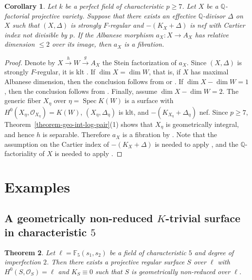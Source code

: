 \documentclass[reqno,oneside]{amsart}
\newtheorem{theorem}{Theorem}[section]
\newtheorem{corollary}[theorem]{Corollary}
\theoremstyle{definition}
\theoremstyle{plain}
\numberwithin{equation}{section}
\newcommand\Spec{\operatorname{Spec}}
\begin{document}
\begin{corollary}\label{corollary-fib-codim2}
  Let $k$ be a perfect field of characteristic $p\ge7$.
  Let $X$ be a $\mathbb Q$-factorial projective variety.
  Suppose that there exists an effective $\mathbb Q$-divisor $\Delta$ on $X$ such that $(X,\Delta)$ is strongly $F$-regular and $-(K_X+\Delta)$ is nef with Cartier index not divisible by $p$.
   If the Albanese morphism $a_X\colon X\to A_X$ has relative dimension $\leq 2$ over its image, then $a_X$ is a fibration.
\end{corollary}
\begin{proof}
  Denote by $X\xrightarrow{h} W\xrightarrow{g} A_X$ the Stein factorization of $a_X$.
  Since $(X,\Delta)$ is strongly $F$-regular, it is klt \cite[Theorem~3.3]{Hara-Watanabe-2002}.
  If $\dim X = \dim W$, that is, if $X$ has maximal Albanese dimension, then the conclusion follows from \cite[Proposition~3.2]{EP23} or \cite[Proposition~2.9]{CWZ26a}.
  If $\dim X - \dim W = 1$, then the conclusion follows from \cite[Theorem~1.5]{CWZ26a}.
  Finally, assume $\dim X - \dim W =2$.
  The generic fiber $X_\eta$ over $\eta=\Spec K(W)$ is a surface with $H^0(X_\eta,\mathcal O_{X_\eta})=K(W)$, $(X_\eta,\Delta_\eta)$ is klt, and $-(K_{X_\eta}+\Delta_\eta)$ nef.
  Since $p\ge7$, Theorem~\ref{theorem-geo-int-log-pair}(1) shows that $X_\eta$ is geometrically integral, and hence $h$ is separable.
  Therefore $a_X$ is a fibration by \cite[Theorem~1.3]{EP23}.
  Note that the assumption on the Cartier index of $-(K_X+\Delta)$ is needed to apply \cite{EP23}, and the $\mathbb Q$-factoriality of $X$ is needed to apply \cite{CWZ26a}.
\end{proof}


\section{Examples}\label{section-exam}
\subsection{A geometrically non-reduced $K$-trivial surface in characteristic $5$}\label{subsection-exam-K-trivial-5}%
\begin{theorem}\label{theorem-exam-K-trivial-5}
  Let $\ell = \mathbb F_5(s_1,s_2)$ be a field of characteristic $5$ and degree of imperfection $2$.
  Then there exists a projective regular surface $S$ over $\ell$ with $H^0(S,\mathcal O_S)=\ell$ and $K_S\equiv0$ such that $S$ is geometrically non-reduced over $\ell$.
\end{theorem}
\end{document}
